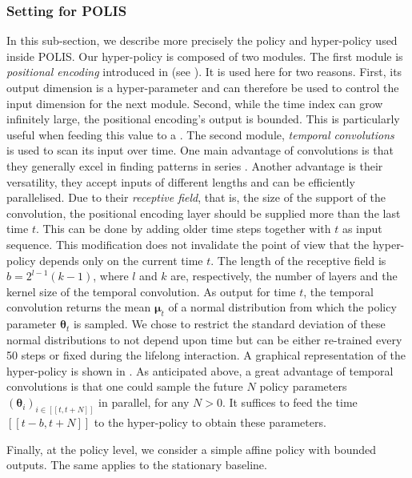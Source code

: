 \subsubsection{Setting for POLIS}
In this sub-section, we describe more precisely the policy and hyper-policy used inside POLIS. 
Our hyper-policy is composed of two modules. 
The first module is \emph{positional encoding} introduced in \cite{vaswani2017attention} (see ). 
It is used here for two reasons. First, its output dimension is a hyper-parameter and can therefore be used to control the input dimension for the next module. 
Second, while the time index can grow infinitely large, the positional encoding's output is bounded. 
This is particularly useful when feeding this value to a .
The second module, \emph{temporal convolutions}~\cite{oord2016wavenet} is used to scan its input over time. 
One main advantage of convolutions is that they generally excel in finding patterns in series \cite{liotet2020deep}.
Another advantage is their versatility, they accept inputs of different lengths and can be efficiently parallelised. 
Due to their \emph{receptive field}, that is, the size of the support of the convolution, the positional encoding layer should be supplied more than the last time $t$.
This can be done by adding older time steps together with $t$ as input sequence.
This modification does not invalidate the point of view that the hyper-policy depends only on the current time $t$.
The length of the receptive field is $b=2^{l-1}(k-1)$, where $l$ and $k$ are, respectively, the number of layers and the kernel size of the temporal convolution.
As output for time $t$, the temporal convolution returns the mean $\boldsymbol{\mu}_t$ of a normal distribution from which the policy parameter $\boldsymbol\theta_t$ is sampled. 
We chose to restrict the standard deviation of these normal distributions to not depend upon time but can be either re-trained every 50 steps or fixed during the lifelong interaction. 
A graphical representation of the hyper-policy is shown in .
As anticipated above, a great advantage of temporal convolutions is that one could sample the future $N$ policy parameters $(\boldsymbol\theta_i)_{i\in[\![t,t+N]\!]}$ in parallel, for any $N>0$. 
It suffices to feed the time $[\![t-b,t+N]\!]$ to the hyper-policy to obtain these parameters. 

Finally, at the policy level, we consider a simple affine policy with bounded outputs. 
The same applies to the stationary baseline.

